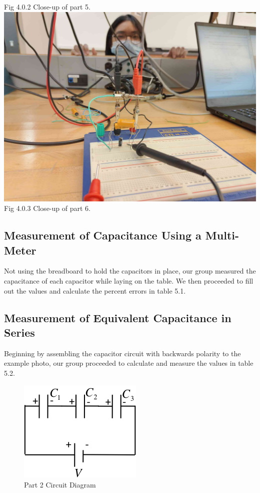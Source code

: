 \documentclass[titlepage]{article}
\begin{document}
\begin{center}
	Fig 4.0.2 Close-up of part 5.\\
	\vspace{1cm}
	\includegraphics[scale=0.12]{selfies/part-6.jpg}\\
	Fig 4.0.3 Close-up of part 6.\\
\end{center}
        \subsection{Measurement of Capacitance Using a Multi-Meter}
        Not using the breadboard to hold the capacitors in place, our group measured the capacitance of each capacitor while laying on the table. We then proceeded to fill out the values and calculate the percent errors in table 5.1.

        \subsection{Measurement of Equivalent Capacitance in Series}
        Beginning by assembling the capacitor circuit with backwards polarity to the example photo, our group proceeded to calculate and measure the values in table 5.2.\\ 

        \begin{figure}[hbt!] 
            \centering
            \caption*{Part 2 Circuit Diagram}
            \includegraphics{images/procedure/part2.png}
        \end{figure} 
\end{document}
